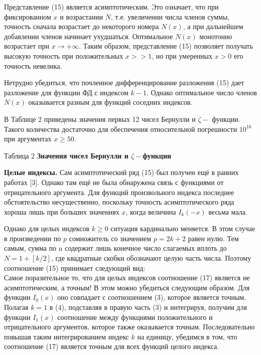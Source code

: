 Представление (15) является асимптотическим. Это означает, что при
фиксированном $x$ и возрастании $N$, т.е. увеличении числа членов суммы,
точность сначала возрастает до некоторого номера $N(x)$, а при дальнейшем
добавлении членов начинает ухудшаться. Оптимальное $N(x)$ монотонно
возрастает при $x \to +\infty$. Таким образом, представление (15) позволяет получать
высокую точность при положительных $x >> 1$, но при умеренных $x > 0$ его
точность невелика.

Нетрудно убедиться, что почленное дифференцирование разложения (15)
дает разложение для функции ФД с индексом $k - 1$. Однако оптимальное
число членов $N(x)$ оказывается разным для функций соседних индексов.

В Таблице 2 приведены значения первых 12 чисел Бернулли и
$\zeta -$ функции. Такого количества достаточно для обеспечения относительной
погрешности $10^{16}$ при аргументах $x \geqslant 50$.

Таблица 2 %
\textbf{Значения чисел Бернулли и $\zeta -$функции}

\textbf{Целые индексы.} Сам асимптотический ряд (15) был получен ещё в ранних
работах [3]. Однако там ещё не была обнаружена связь с функциями от
отрицательного аргумента. Для функций произвольного индекса последнее
обстоятельство несущественно, поскольку точность асимптотического ряда
хороша лишь при больших значениях $x$, когда величина $I_k(-x)$ весьма мала.

Однако для целых индексов $k \geqslant 0$ ситуация кардинально меняется. В этом
случае в произведении по $p$ сомножитель со значением $p = 2k + 2$ равен нулю.
Тем самым, сумма по n содержит лишь конечное число слагаемых вплоть до
$N=1+[k/2]$, где квадратные скобки обозначают целую часть числа. Поэтому
соотношение (15) принимает следующий вид:
\begin{equation}
\label{eq:ref_2_5_3}
\end{equation}
Самое поразительное то, что для целых индексов соотношение (17) является не
асимптотическим, а точным! В этом можно убедиться следующим образом. Для
функции $I_0(x)$ оно совпадает с соотношением (3), которое является точным.
Полагая $k=1$ в (4), подставляя в правую часть (3) и интегрируя, получим для
функции $I_1(x)$ соотношение между функциями положительного и
отрицательного аргументов, которое также оказывается точным.
Последовательно повышая таким интегрированием индекс $k$ на единицу,
убедимся в том, что соотношение (17) является точным для всех функций
целого индекса.

